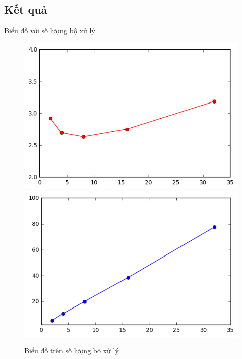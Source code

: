 \documentclass{beamer}
\begin{document}
\subsection{Kết quả}
\begin{frame}{Biểu đồ  với số lượng bộ xử lý }
\begin{figure}[H]
\includegraphics[scale=0.4]{ms.png}
\includegraphics[scale=0.4]{ov.png}
\caption{Biểu đồ trên số lượng bộ xử lý}
\end{figure}


\end{frame}
\end{document}
